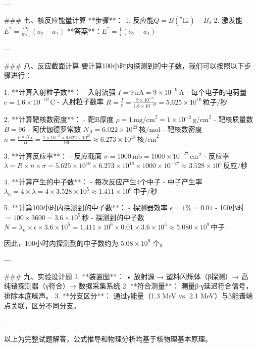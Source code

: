 \documentclass{article}
\begin{document}
---

### 七、核反应能量计算  
**步骤**：  
1. 反应能\(Q = B(^7\text{Li}) - B_d\)  
2. 激发能\(E^* = \frac{m_p}{m_{^7\text{Li}}} (a_2 - a_1)\)  
**答案**：\(E^* = \frac{1}{7}(a_2 - a_1)\)

---

### 八、反应截面计算  
要计算100小时内探测到的中子数，我们可以按照以下步骤进行：

1. **计算入射粒子数**：
   - 入射流强 \( I = 9 \, \text{nA} = 9 \times 10^{-9} \, \text{A} \)
   - 每个电子的电荷量 \( e = 1.6 \times 10^{-19} \, \text{C} \)
   - 入射粒子数率 \( R = \frac{I}{e} = \frac{9 \times 10^{-9}}{1.6 \times 10^{-19}} = 5.625 \times 10^{10} \, \text{粒子/秒} \)

2. **计算靶核数密度**：
   - 靶B厚度 \( \rho = 1 \, \text{mg/cm}^2 = 1 \times 10^{-3} \, \text{g/cm}^2 \)
   - 靶核质量数 \( B = 96 \)
   - 阿伏伽德罗常数 \( N_A = 6.022 \times 10^{23} \, \text{核/mol} \)
   - 靶核数密度 \( n = \frac{\rho \times N_A}{B} = \frac{1 \times 10^{-3} \times 6.022 \times 10^{23}}{96} \approx 6.273 \times 10^{18} \, \text{核/cm}^2 \)

3. **计算反应率**：
   - 反应截面 \( \sigma = 1000 \, \text{mb} = 1000 \times 10^{-27} \, \text{cm}^2 \)
   - 反应率 \( \lambda = R \times n \times \sigma = 5.625 \times 10^{10} \times 6.273 \times 10^{18} \times 1000 \times 10^{-27} \approx 3.528 \times 10^{5} \, \text{反应/秒} \)

4. **计算产生的中子数**：
   - 每次反应产生4个中子
   - 中子产生率 \( \lambda_n = 4 \times \lambda = 4 \times 3.528 \times 10^{5} \approx 1.411 \times 10^{6} \, \text{中子/秒} \)

5. **计算100小时内探测到的中子数**：
   - 探测器效率 \( \epsilon = 1\% = 0.01 \)
   - 100小时 \( = 100 \times 3600 = 3.6 \times 10^{5} \, \text{秒} \)
   - 探测到的中子数 \( N = \lambda_n \times \epsilon \times 3.6 \times 10^{5} = 1.411 \times 10^{6} \times 0.01 \times 3.6 \times 10^{5} \approx 5.080 \times 10^{9} \, \text{中子} \)

因此，100小时内探测到的中子数约为 \( 5.08 \times 10^{9} \) 个。

---

### 九、实验设计题  
1. **装置图**：  
   • 放射源 → 塑料闪烁体（β探测）→ 高纯锗探测器（γ符合）→ 数据采集系统  
2. **符合测量**：  
   测量β-γ延迟符合信号，排除本底噪声。  
3. **分支区分**：  
   通过γ能量（1.3 MeV vs. 2.1 MeV）与β能谱端点关联，区分不同分支。  

---

以上为完整试题解答，公式推导和物理分析均基于核物理基本原理。
\end{document}

